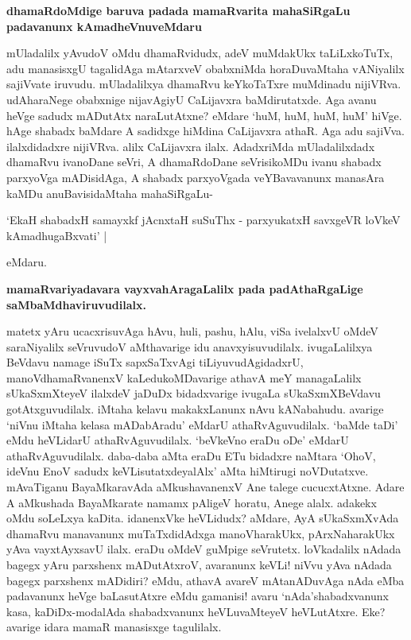 {\bigskip
\noindent
{\large\bf dhamaRdoMdige baruva padada mamaRvarita mahaSiRgaLu padavanunx kAmadheVnuveMdaru}}\label{page205}
\medskip

\noindent
mUladalilx yAvudoV oMdu dhamaRvidudx, adeV muMdakUkx taLiLxkoTuTx, adu manasisxgU tagali\-dAga mAtarxveV obabxniMda horaDuvaMtaha vANiyalilx sajiVvate iruvudu. mUladalilxya dhamaRvu keYkoTaTxre muMdinadu nijiVRva. udAharaNege obabxnige nijavAgiyU CaLijavxra baMdirutatxde. Aga avanu heVge sadudx mADutAtx naraLutAtxne? eMdare `huM, huM, huM, huM' hiVge. hAge shabadx baMdare A sadidx\-ge hiMdina CaLijavxra athaR. Aga adu sajiVva. ilalxdidadxre nijiVRva. alilx CaLijavxra ilalx. AdadxriMda mUladalilxdadx dhamaRvu ivanoDane seVri, A dhamaRdoDane seVrisikoMDu ivanu shabadx parxyoVga mADi\-sidAga, A shabadx parxyoVgada veYBavavanunx manasAra kaMDu anuBavisidaMtaha mahaSiRgaLu-

\begin{shloka}
`EkaH shabadxH samayxkf jAcnxtaH suSuThx - parxyukatxH savxgeVR loVkeV kAmadhugaBxvati' |\label{205}
\end{shloka}

\noindent
eMdaru.

{\bigskip
\noindent
{\large\bf mamaRvariyadavara vayxvahAragaLalilx pada padAthaRgaLige saMbaMdha\break\-viruvudilalx.}}\label{page205}
\medskip

\noindent
matetx yAru ucacxrisuvAga hAvu, huli, pashu, hAlu, viSa ivelalxvU oMdeV saraNiyalilx seVru\-vudoV aMthavarige idu anavxyisuvudilalx. ivugaLalilxya BeVdavu namage iSuTx sapxSaTxvAgi tiLiyuvu\-dAgidadxrU, manoVdhamaRvanenxV kaLedukoMDavarige athavA meY managaLalilx sUkaSxmXteyeV ilalxdeV jaDuDx bidadxvarige ivugaLa sUkaSxmXBeVdavu gotAtxguvudilalx. iMtaha kelavu makakxLanunx nAvu kANabahudu. avarige `niVnu iMtaha kelasa mADabAradu' eMdarU athaRvAguvudilalx. `baMde taDi' eMdu heVLi\-darU athaRvAguvudilalx. `beVkeVno eraDu oDe' eMdarU athaRvAguvudilalx. daba-daba aMta eraDu ETu bidadxre naMtara `OhoV, ideVnu EnoV sadudx keVLisutatxdeyalAlx' aMta hiMtirugi noVDutatxve. mAva\-Tiganu BayaMkaravAda aMkushavanenxV Ane talege cucucxtAtxne. Adare A aMkushada BayaMkarate namamx pAligeV horatu, Anege alalx. adakekx oMdu soLeLxya kaDita. idanenxVke heVLidudx? aMdare, AyA sUkaSxmXvAda dhamaRvu manavanunx muTaTxdidAdxga manoVharakUkx, pArxNaharakUkx yAva vayxtAyxsavU ilalx. eraDu oMdeV guMpige seVrutetx. loVkadalilx nAdada bagegx yAru parxshenx mADutAtxroV, avaranunx keVLi! niVvu yAva nAdada bagegx parxshenx mADidiri? eMdu, athavA avareV mAtanADuvAga nAda eMba pada\-vanunx heVge baLasutAtxre eMdu gamanisi! avaru `nAda'shabadxvanunx kasa, kaDiDx-modalAda shabadxvanunx heVLu\-vaMteyeV heVLutAtxre. Eke? avarige idara mamaR manasisxge tagulilalx.

